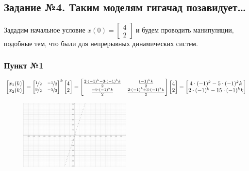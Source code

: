 \documentclass[a3paper,14pt]{extarticle}
\begin{document}
\subsection*{\centering Задание №4. Таким моделям гигачад позавидует\ldots}
Зададим начальное условие $x(0) = \left[\begin{smallmatrix}
    4 \\ 2
\end{smallmatrix}\right]$ и будем проводить манипуляции, подобные тем, что были для непрерывных динамических систем.
\subsubsection*{Пункт №1}
$$\begin{bmatrix}
    x_1(k) \\ x_2(k)
\end{bmatrix} = \begin{bmatrix}
    \nicefrac{1}{2} & \nicefrac{-1}{2} \\ \nicefrac{9}{2} & \nicefrac{-5}{2}
\end{bmatrix}^k\begin{bmatrix}
    4 \\ 2
\end{bmatrix} = \begin{bmatrix}
    \frac{2\cdot(-1)^k-3\cdot(-1)^kk}{2} & \frac{(-1)^kk}{2} \\
    \frac{-9\cdot(-1)^kk}{2} & \frac{2\cdot(-1)^k+3\cdot(-1)^kk}{2}
\end{bmatrix}\begin{bmatrix}
    4 \\ 2
\end{bmatrix} = \begin{bmatrix}
    4\cdot(-1)^k-5\cdot(-1)^kk \\ 2\cdot(-1)^k-15\cdot(-1)^kk
\end{bmatrix}$$
\begin{figure}[h]
    \centering\includegraphics[width=0.5\textwidth]{4.1.png}
\end{figure} \pagebreak
\end{document}

